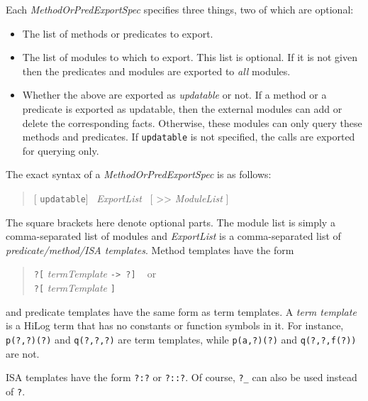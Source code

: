\documentclass[11pt]{article}
\begin{document}
Each \emph{MethodOrPredExportSpec} specifies three things, two of which are
optional:
\begin{itemize}
  \item  The list of methods or predicates to export.
  \item  The list of modules to which to export.
     This list is optional. If it is not given then the predicates
     and modules are exported to \emph{all} modules.
   \item  Whether the above are exported as \emph{updatable} or not. 
     If a method or a predicate is exported as updatable, then the external
     modules can add or delete the corresponding facts. Otherwise, these
     modules can only query these methods and predicates.
     If {\tt updatable} is not specified, the calls are exported for
     querying only.
\end{itemize}
The exact syntax of a \emph{MethodOrPredExportSpec} is as follows:
\begin{quote}
    [ {\tt updatable}]~ \emph{ExportList}~ [ \textnormal{>{}>} \emph{ModuleList} ]
\end{quote}
The square brackets here denote optional parts. The module list is simply a
comma-separated list of modules and \emph{ExportList} is a comma-separated
list of \emph{predicate/method/ISA templates}. Method templates have the form
\begin{quote}
   {\tt ?[} \emph{termTemplate} {\tt -> ?]} ~ or\\
   {\tt ?[} \emph{termTemplate} {\tt]}\\
\end{quote}
and predicate templates have the same form as term templates. A \emph{term
  template} is a HiLog term that has no constants or function symbols in
it. For instance, {\tt p(?,?)(?)} and {\tt q(?,?,?)} are term templates,
while {\tt p(a,?)(?)} and {\tt q(?,?,f(?))} are not.

ISA templates have the form  {\tt ?:?} or {\tt ?::?}.   Of course, {\tt ?\_}
can also be used instead of {\tt ?}.
\end{document}

